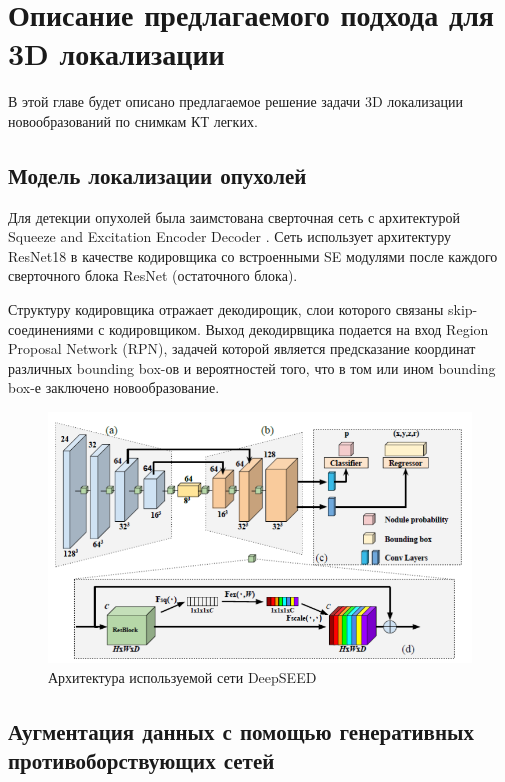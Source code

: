 \chapter{Описание предлагаемого подхода для 3D локализации}

В этой главе будет описано предлагаемое решение задачи 3D локализации новообразований по снимкам КТ легких.

\section{Модель локализации опухолей}

Для детекции опухолей была заимстована сверточная сеть с архитектурой Squeeze and Excitation Encoder Decoder \cite{li2019deepseed}. Сеть использует архитектуру ResNet18 в качестве кодировщика со встроенными SE модулями после каждого сверточного блока ResNet (остаточного блока). 

Структуру кодировщика отражает декодирощик, слои которого связаны skip-соединениями с кодировщиком. Выход декодирвщика подается на вход Region Proposal Network (RPN), задачей которой является предсказание координат различных bounding box-ов и вероятностей того, что в том или ином bounding box-е заключено новообразование.

\begin{figure}[!h]
\includegraphics[width=\linewidth]{images/deep-seed-architecture.png}
\caption{Архитектура используемой сети DeepSEED}\label{deep-seed-architecture}
\centering
\end{figure}


\section{Аугментация данных с помощью генеративных противоборствующих сетей}


